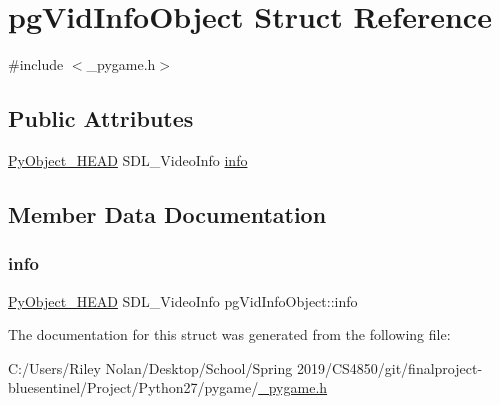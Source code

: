 \hypertarget{structpg_vid_info_object}{}\section{pg\+Vid\+Info\+Object Struct Reference}
\label{structpg_vid_info_object}


{\ttfamily \#include $<$\+\_\+pygame.\+h$>$}

\subsection*{Public Attributes}
\begin{DoxyCompactItemize}
\item 
\mbox{\hyperlink{_python27_2object_8h_a0bf35c1f3ea13f925de94d8593db3b7e}{Py\+Object\+\_\+\+H\+E\+AD}} S\+D\+L\+\_\+\+Video\+Info \mbox{\hyperlink{structpg_vid_info_object_aadf54f872fe0f87133d29cddcb6c8fcc}{info}}
\end{DoxyCompactItemize}


\subsection{Member Data Documentation}
\mbox{\label{structpg_vid_info_object_aadf54f872fe0f87133d29cddcb6c8fcc}} 
\subsubsection{\texorpdfstring{info}{info}}
{\footnotesize\ttfamily \mbox{\hyperlink{_python27_2object_8h_a0bf35c1f3ea13f925de94d8593db3b7e}{Py\+Object\+\_\+\+H\+E\+AD}} S\+D\+L\+\_\+\+Video\+Info pg\+Vid\+Info\+Object\+::info}



The documentation for this struct was generated from the following file\+:\begin{DoxyCompactItemize}
\item 
C\+:/\+Users/\+Riley Nolan/\+Desktop/\+School/\+Spring 2019/\+C\+S4850/git/finalproject-\/bluesentinel/\+Project/\+Python27/pygame/\mbox{\hyperlink{__pygame_8h}{\+\_\+pygame.\+h}}\end{DoxyCompactItemize}
